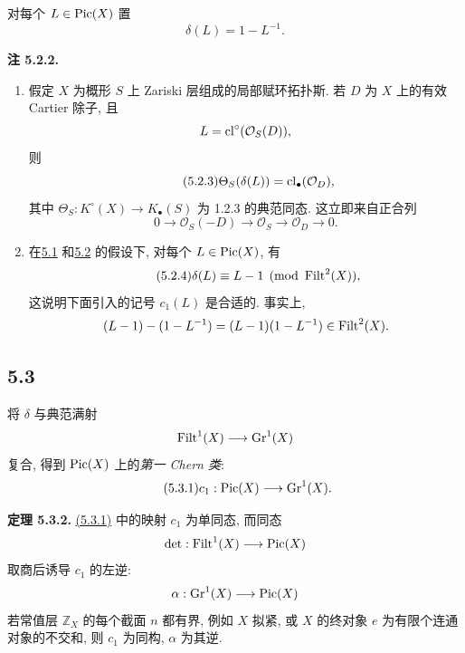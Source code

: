 对每个 $L\in\operatorname{Pic}(X)$ 置
\[
\delta(L)=1-L^{-1}.
\]

\textbf{注 5.2.2.}
\begin{enumerate}[label=\alph*)]
\item 假定 $X$ 为概形 $S$ 上 Zariski 层组成的局部赋环拓扑斯. 若 $D$ 为 $X$ 上的有效 Cartier 除子, 且
%
\[
L=\operatorname{cl}^\circ(\mathcal O_S(D)),
\]
则
\begin{equation}\tag{5.2.3}
\Theta_S(\delta(L))=\operatorname{cl}_\bullet(\mathcal O_D),
\end{equation}
其中 $\Theta_S:K^\circ(X)\to K_\bullet(S)$ 为 1.2.3 的典范同态. 这立即来自正合列
%
\[
0\longrightarrow\mathcal O_S(-D)\longrightarrow\mathcal O_S
\longrightarrow\mathcal O_D\longrightarrow0.
\]

\item 在\hyperlink{sga6.e10.sec.5.1}{5.1} 和\hyperlink{sga6.e10.sec.5.2}{5.2} 的假设下, 对每个 $L\in\operatorname{Pic}(X)$, 有
%
\begin{equation}\tag{5.2.4}
\delta(L)\equiv L-1\pmod{\operatorname{Filt}^2(X)},
\end{equation}
这说明下面引入的记号 $c_1(L)$ 是合适的. 事实上,
\[
(L-1)-(1-L^{-1})=(L-1)(1-L^{-1})\in\operatorname{Filt}^2(X).
\]
\end{enumerate}

\subsection*{5.3} 将 $\delta$ 与典范满射
%
\[
\operatorname{Filt}^1(X)\longrightarrow\operatorname{Gr}^1(X)
\]
复合, 得到 $\operatorname{Pic}(X)$ 上的\emph{第一 Chern 类}:
\begin{equation}\tag{5.3.1}
c_1:\operatorname{Pic}(X)\longrightarrow\operatorname{Gr}^1(X).
\end{equation}

\textbf{定理 5.3.2.} \hyperlink{sga6.e10.eq.5-3-1}{(5.3.1)} 中的映射 $c_1$ 为单同态, 而同态
%
\[
\det:\operatorname{Filt}^1(X)\longrightarrow\operatorname{Pic}(X)
\]
取商后诱导 $c_1$ 的左逆:
\[
\alpha:\operatorname{Gr}^1(X)\longrightarrow\operatorname{Pic}(X)
\]
若常值层 $\mathbb Z_X$ 的每个截面 $n$ 都有界, 例如 $X$ 拟紧, 或 $X$ 的终对象 $e$ 为有限个连通对象的不交和, 则 $c_1$ 为同构, $\alpha$ 为其逆.
%
%
%

